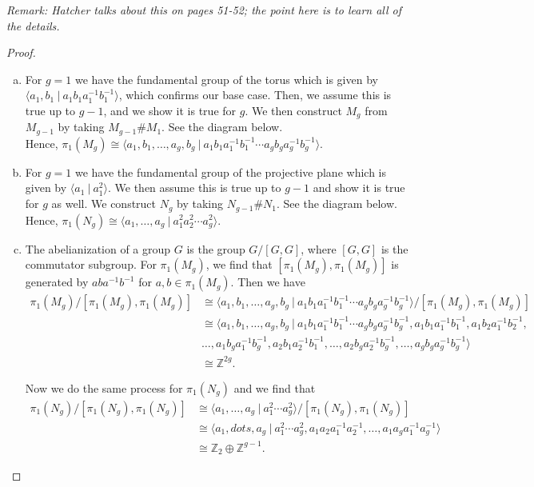 \documentclass[leqno]{article}
\theoremstyle{nonumberplain}
\newtheorem{proof}{Proof}
\newcommand{\Z}{\mathbb{Z}}
\begin{document}
\emph{Remark: Hatcher talks about this on pages 51-52; the point here is to learn all of the details.}

\begin{proof}~
\begin{enumerate}[(a)]
\item For $g=1$ we have the fundamental group of the torus which is given by $\langle a_1,b_1 ~\vert~ a_1b_1a_1^{-1}b_1^{-1}\rangle$, which confirms our base case.  Then, we assume this is true up to $g-1$, and we show it is true for $g$.  We then construct $M_g$ from $M_{g-1}$ by taking $M_{g-1}\# M_1$.  See the diagram below.
\vspace*{6cm}\\
Hence, $\pi_1(M_g)\cong \langle a_1,b_1,\dots,a_g,b_g ~\vert~ a_1b_1a_1^{-1}b_1^{-1}\cdots a_gb_ga_g^{-1}b_g^{-1} \rangle$.
\item For $g=1$ we have the fundamental group of the projective plane which is given by $\langle a_1 ~\vert ~ a_1^2\rangle$.  We then assume this is true up to $g-1$ and show it is true for $g$ as well.  We construct $N_g$ by taking $N_{g-1}\# N_1$. See the diagram below.
\vspace*{6cm}\\
Hence, $\pi_1(N_g)\cong \langle a_1,\dots,a_g ~\vert~ a_1^2a_2^2\cdots a_g^2 \rangle$.
\item The abelianization of a group $G$ is the group $G/[G,G]$, where $[G,G]$ is the commutator subgroup.  For $\pi_1(M_g)$, we find that $[\pi_1(M_g),\pi_1(M_g)]$ is generated by $aba^{-1}b^{-1}$ for $a,b\in \pi_1(M_g)$.  Then we have
\begin{align*}
\pi_1(M_g)/[\pi_1(M_g),\pi_1(M_g)]&\cong \langle a_1,b_1,\dots,a_g,b_g ~\vert~ a_1b_1a_1^{-1}b_1^{-1}\cdots a_gb_ga_g^{-1}b_g^{-1}\rangle/[\pi_1(M_g),\pi_1(M_g)] \\
&\cong \langle a_1,b_1,\dots,a_g,b_g ~\vert ~ a_1b_1a_1^{-1}b_1^{-1}\cdots a_gb_ga_g^{-1}b_g^{-1},a_1b_1a_1^{-1}b_1^{-1}, a_1b_2a_1^{-1}b_2^{-1},\\
&\dots,a_1b_ga_1^{-1}b_g^{-1},a_2b_1a_2^{-1}b_1^{-1},\dots,a_2b_ga_2^{-1}b_g^{-1},\dots,a_gb_ga_g^{-1}b_g^{-1}\rangle\\
&\cong \Z^{2g}.
\end{align*} 

Now we do the same process for $\pi_1(N_g)$ and we find that
\begin{align*}
\pi_1(N_g)/[\pi_1(N_g),\pi_1(N_g)]&\cong \langle a_1,\dots,a_g ~\vert~ a_1^2\cdots a_g^2 \rangle/[\pi_1(N_g),\pi_1(N_g)]\\
&\cong \langle a_1,dots,a_g ~\vert~ a_1^2\cdots a_g^2, a_1a_2a_1^{-1}a_2^{-1},\dots,a_1a_ga_1^{-1}a_g^{-1}\rangle\\
&\cong \Z_2 \oplus \Z^{g-1}.
\end{align*}


\end{enumerate}
\end{proof}
\end{document}
